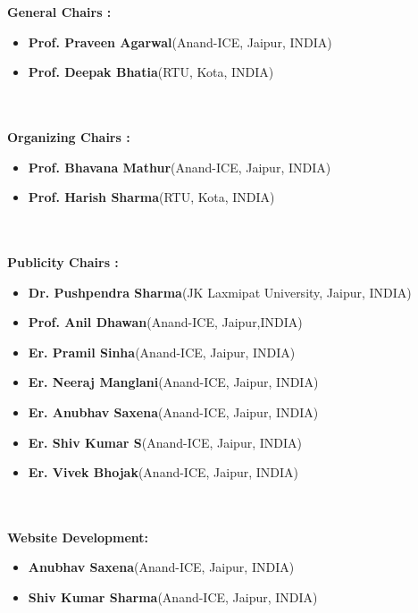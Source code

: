 \documentclass[twoside,11pt]{amsart}
\begin{document}
\newpage
{\Large \bf General Chairs :}
\\
\begin{itemize}
\item \textbf{Prof. Praveen Agarwal}(Anand-ICE, Jaipur, INDIA)
\item\textbf{Prof. Deepak Bhatia}(RTU, Kota, INDIA)
\end{itemize}
\noindent
\\
\\
{\Large \bf Organizing Chairs :}
\\
\begin{itemize}
\item \textbf{Prof. Bhavana Mathur}(Anand-ICE, Jaipur, INDIA)
\item\textbf{Prof. Harish Sharma}(RTU, Kota, INDIA)
\end{itemize}
\noindent
\\
\\
{\Large \bf Publicity Chairs :}
\\
\begin{itemize}
\item \textbf{Dr. Pushpendra Sharma}(JK Laxmipat University, Jaipur, INDIA)
\item\textbf{Prof. Anil Dhawan}(Anand-ICE, Jaipur,INDIA)
\item \textbf{Er. Pramil Sinha}(Anand-ICE, Jaipur, INDIA)
\item\textbf{Er. Neeraj Manglani}(Anand-ICE, Jaipur, INDIA)
\item \textbf{Er. Anubhav Saxena}(Anand-ICE, Jaipur, INDIA)
\item\textbf{Er. Shiv Kumar S}(Anand-ICE, Jaipur, INDIA)
\item\textbf{Er. Vivek Bhojak}(Anand-ICE, Jaipur, INDIA)
\end{itemize}
\noindent
\\
\\
{\Large \bf Website Development:}
\\
\begin{itemize}
\item \textbf{ Anubhav Saxena}(Anand-ICE, Jaipur, INDIA)
\item\textbf{ Shiv Kumar Sharma}(Anand-ICE, Jaipur, INDIA)
\end{itemize}
\end{document}
